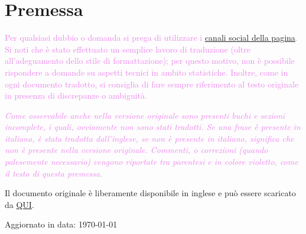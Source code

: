 \section*{Premessa}

\textcolor{violet}{Per qualsiasi dubbio o domanda si prega di utilizzare i \href{https://sites.google.com/view/udc-archivio-clip/social}{canali social della pagina}. Si noti che è stato effettuato un semplice lavoro di traduzione (oltre all'adeguamento dello stile di formattazione); per questo motivo, non è possibile rispondere a domande su aspetti tecnici in ambito statistiche. Inoltre, come in ogni documento tradotto, si consiglia di fare sempre riferimento al testo originale in presenza di discrepanze o ambiguità.}

\vskip 10pt

\textcolor{violet}{\textit{Come osservabile anche nella versione originale sono presenti buchi e sezioni incomplete, i quali, ovviamente non sono stati tradotti. Se una frase è presente in italiano, è stata tradotta dall'inglese, se non è presente in italiano, significa che non è presente nella versione originale. Commenti, o correzioni (quando palesemente necessario) vengono riportate tra parentesi e in colore violetto, come il testo di questa premessa.}}

\vskip 10pt

Il documento originale è liberamente disponibile in inglese e può essere scaricato da \href{https://assets.fiba.basketball/image/upload/documents-corporate-fiba-statisticians-manual-2024.pdf}{QUI}.

\vskip 90pt

Aggiornato in data: \today

\newpage

\setcounter{page}{1}

\renewcommand{\thesection}{\Roman{section}}